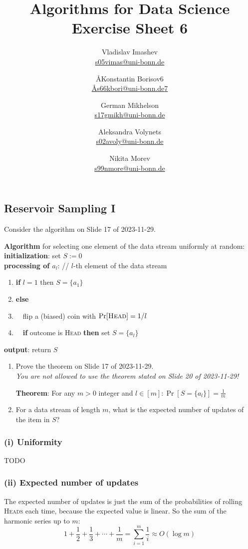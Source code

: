 \documentclass{article}
\title{Algorithms for Data Science \\ Exercise Sheet 6}
\author{
  Vladislav Imashev \\ \href{mailto:s05vimas@uni-bonn.de}{s05vimas@uni-bonn.de} \and
  \AA{Konstantin Borisov}{6} \\ \href{mailto:\AA{s66kbori@uni-bonn.de}{7}}{\AA{s66kbori@uni-bonn.de}{7}} \and
  German Mikhelson \\ \href{mailto:s17gmikh@uni-bonn.de}{s17gmikh@uni-bonn.de} \and
  Aleksandra Volynets \\ \href{mailto:s02avoly@uni-bonn.de}{s02avoly@uni-bonn.de} \and
  Nikita Morev \\ \href{mailto:s99nmore@uni-bonn.de}{s99nmore@uni-bonn.de}
}
\begin{document}
  \maketitle

  \setcounter{section}{6}
  \subsection{Reservoir Sampling I}
  \begin{centerframebox}
    Consider the algorithm on Slide 17 of 2023-11-29.

    \textbf{Algorithm} for selecting one element of the data stream uniformly at random: \\
    \textbf{initialization}: set $S := 0$ \\
    \textbf{processing of $a_l$}: // $l$-th element of the data stream
    \begin{enumerate}[topsep=0pt,itemsep=-1ex,partopsep=1ex,parsep=1ex]
      \item \textbf{if} $l = 1$ then $S = \{a_1\}$
      \item \textbf{else}
      \item ~~flip a (biased) coin with $\Pr[\textsc{Head}] = 1/l$
      \item ~~\textbf{if} outcome is \textsc{Head} \textbf{then} set $S = \{a_l\}$
    \end{enumerate}
    \textbf{output}: return $S$

    \begin{enumerate}[label=(\roman*)]
      \item Prove the theorem on Slide 17 of 2023-11-29. \\
      \textit{You are not allowed to use the theorem stated on Slide 20 of 2023-11-29!}

      \textbf{Theorem}: For any $m > 0$ integer and $l \in [m]: \Pr[S = \{a_l\}] = \frac{1}{m}$

      \item For a data stream of length $m$, what is the expected number of updates of the item in $S$?
    \end{enumerate}
  \end{centerframebox}
  \subsubsection*{(i) Uniformity}
  TODO%

  \subsubsection*{(ii) Expected number of updates}
  The expected number of updates is just the sum of the probabilities of rolling \textsc{Heads} each time,
  because the expected value is linear.
  So the sum of the harmonic series up to $m$:
  \[ 1+\frac{1}{2}+\frac{1}{3} + \cdots + \frac{1}{m} = \sum_{i=1}^m \frac{1}{i} \approx O(\log m) \]
\end{document}
